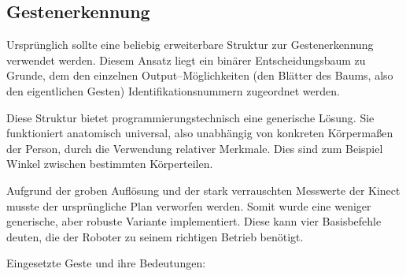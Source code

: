 \subsection{Gestenerkennung}
\label{gestenerkennung_gestenerkennung_sec}
\authorsection{\editormarton}

Ursprünglich sollte eine beliebig erweiterbare Struktur zur Gestenerkennung verwendet werden.
 Diesem Ansatz liegt ein binärer Entscheidungsbaum zu Grunde, dem den einzelnen
 Output--Möglichkeiten (den Blätter des Baums, also den eigentlichen
 Gesten) Identifikationsnummern zugeordnet werden.

Diese Struktur bietet programmierungstechnisch eine generische Lösung. Sie funktioniert anatomisch universal,
 also unabhängig von konkreten Körpermaßen der Person, durch die Verwendung relativer Merkmale.
 Dies sind zum Beispiel Winkel zwischen bestimmten Körperteilen.
 
Aufgrund der groben Auflösung und der stark verrauschten Messwerte der Kinect musste der ursprüngliche Plan verworfen werden.
 Somit wurde eine weniger generische, aber robuste Variante implementiert. Diese kann vier Basisbefehle deuten, die der Roboter zu seinem richtigen Betrieb benötigt.
\vspace{0.3cm}

\noindent Eingesetzte Geste und ihre Bedeutungen:

